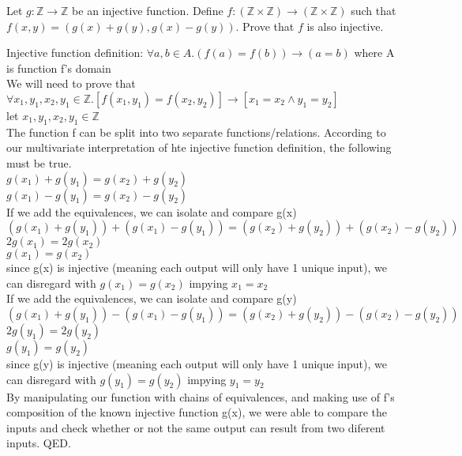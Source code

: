 \documentclass[solution,letterpaper]{cs20}
\begin{document}
    \begin{problem}
        Let $g : \mathbb{Z} \rightarrow \mathbb{Z}$ be an injective function. Define $f : (\mathbb{Z}\times\mathbb{Z}) \rightarrow (\mathbb{Z}\times\mathbb{Z})$ such that $f(x,y) = (g(x) + g(y), g(x) - g(y))$. Prove that $f$ is also injective.

        \begin{solution}
            Injective function definition: $\forall a,b \in A. (f(a) = f(b)) \to (a = b)$ where A is function f's domain \\
            We will need to prove that $\forall x_1, y_1, x_2, y_1 \in \mathbb{Z}. [f(x_1, y_1) = f(x_2, y_2)] \to [x_1 = x_2 \land y_1 = y_2] $ \\

            let $x_1, y_1, x_2, y_1 \in \mathbb{Z}$ \\
            The function f can be split into two separate functions/relations. According to our multivariate interpretation of hte injective function definition, the following must be true.\\
            $g(x_1) + g(y_1) = g(x_2) + g(y_2)$ \\
            $g(x_1) - g(y_1) = g(x_2) - g(y_2)$ \\

            If we add the equivalences, we can isolate and compare g(x) \\
            $ (g(x_1) + g(y_1)) + (g(x_1) - g(y_1)) = (g(x_2) + g(y_2)) + (g(x_2) - g(y_2)) $ \\
            $ 2g(x_1) = 2g(x_2) $ \\
            $ g(x_1) = g(x_2) $ \\
            since g(x) is injective (meaning each output will only have 1 unique input), we can disregard with $g(x_1) = g(x_2)$ impying $x_1 = x_2$ \\

            If we add the equivalences, we can isolate and compare g(y)
            $(g(x_1) + g(y_1)) - (g(x_1) - g(y_1)) = (g(x_2) + g(y_2)) - (g(x_2) - g(y_2)) $ \\
            $2g(y_1) = 2g(y_2) $ \\
            $g(y_1) = g(y_2) $ \\
            since g(y) is injective (meaning each output will only have 1 unique input), we can disregard with $g(y_1) = g(y_2)$ impying $y_1 = y_2$ \\

            By manipulating our function with chains of equivalences, and making use of f's composition of the known injective function g(x), we were able to compare the inputs and check whether or not the same output can result from two diferent inputs. QED.



        \end{solution}
    \end{problem}
\end{document}
